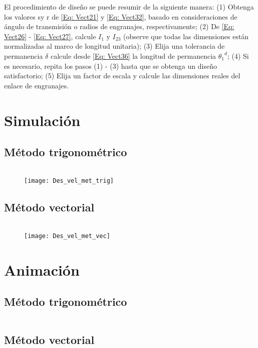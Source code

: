 \documentclass[12pt, final]{extarticle}
\begin{document}
El procedimiento de diseño se puede resumir de la siguiente manera: (1) Obtenga
los valores sy r de \eqref{Eq: Vect21} y \eqref{Eq: Vect32}, basado en
consideraciones de ángulo de transmisión o radios de engranajes,
respectivamente; (2) De \eqref{Eq: Vect26} - \eqref{Eq: Vect27}, calcule $I_1$ y
$I_{23}$ (observe que todas las dimensiones están normalizadas al marco de
longitud unitaria); (3) Elija una tolerancia de permanencia $\delta$ calcule
desde \eqref{Eq: Vect36} la longitud de permanencia ${\theta_1}^d$; (4) Si es
necesario, repita los pasos (1) - (3) hasta que se obtenga un diseño
satisfactorio; (5) Elija un factor de escala y calcule las dimensiones reales
del enlace de engranajes.

\newpage
\section{Simulación}
\subsection{Método trigonométrico}

{\small
\inputminted{matlab}{Codigos/ADA5_metodo_trig.m}}

\begin{figure}[ht]
    \centering
    \texttt{[image: Des\_vel\_met\_trig]}
\end{figure}

\newpage
\subsection{Método vectorial}

{\small
\inputminted{matlab}{Codigos/ADA5_metodo_vec.m}}

\begin{figure}[ht]
    \centering
    \texttt{[image: Des\_vel\_met\_vec]}
\end{figure}

\newpage
\section{Animación}
\subsection{Método trigonométrico}

{\small
\inputminted{matlab}{Codigos/ADA5_metodo_trig_animacion.m}}

\newpage
\subsection{Método vectorial}

{\small
\inputminted{matlab}{Codigos/ADA5_metodo_vec_animacion.m}}

\nocite{*}
\vfill


\end{document}
